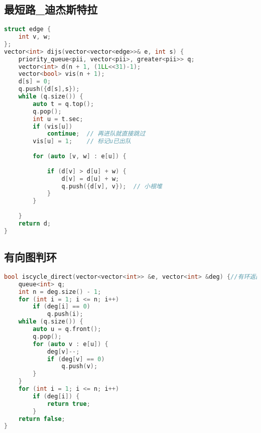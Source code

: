 \subsection{最短路\_迪杰斯特拉}
\begin{lstlisting}[language=C++]
struct edge {
    int v, w;
};
vector<int> dijs(vector<vector<edge>>& e, int s) {
    priority_queue<pii, vector<pii>, greater<pii>> q;
    vector<int> d(n + 1, (1LL<<31)-1);
    vector<bool> vis(n + 1);
    d[s] = 0;
    q.push({d[s],s});
    while (q.size()) {
        auto t = q.top();
        q.pop();
        int u = t.sec;
        if (vis[u])
            continue;  // 再进队就直接跳过
        vis[u] = 1;    // 标记u已出队
        
        for (auto [v, w] : e[u]) {
            
            if (d[v] > d[u] + w) {
                d[v] = d[u] + w;
                q.push({d[v], v});  // 小根堆
            }
        }
        
    }
    return d;
}
\end{lstlisting}
\subsection{有向图判环}
\begin{lstlisting}[language=C++]
bool iscycle_direct(vector<vector<int>> &e, vector<int> &deg) {//有环返回true
    queue<int> q;
    int n = deg.size() - 1;
    for (int i = 1; i <= n; i++)
        if (deg[i] == 0)
            q.push(i);
    while (q.size()) {
        auto u = q.front();
        q.pop();
        for (auto v : e[u]) {
            deg[v]--;
            if (deg[v] == 0)
                q.push(v);
        }
    }
    for (int i = 1; i <= n; i++)
        if (deg[i]) {
            return true;
        }
    return false;
}
\end{lstlisting}
